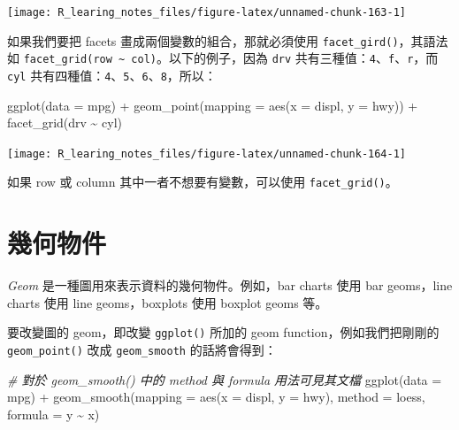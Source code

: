 \documentclass[
]{book}
\newenvironment{Shaded}{\begin{snugshade}}{\end{snugshade}}
\newcommand{\AttributeTok}[1]{\textcolor[rgb]{0.77,0.63,0.00}{#1}}
\newcommand{\CommentTok}[1]{\textcolor[rgb]{0.56,0.35,0.01}{\textit{#1}}}
\newcommand{\FunctionTok}[1]{\textcolor[rgb]{0.00,0.00,0.00}{#1}}
\newcommand{\NormalTok}[1]{#1}
\newcommand{\SpecialCharTok}[1]{\textcolor[rgb]{0.00,0.00,0.00}{#1}}
\newcommand{\StringTok}[1]{\textcolor[rgb]{0.31,0.60,0.02}{#1}}
\theoremstyle{definition}
\theoremstyle{remark}
\begin{document}
\begin{center}\texttt{[image: R\_learing\_notes\_files/figure-latex/unnamed-chunk-163-1]} \end{center}

如果我們要把 facets 畫成兩個變數的組合，那就必須使用 \texttt{facet\_gird()}，其語法如 \texttt{facet\_grid(row\ \textasciitilde{}\ col)}。以下的例子，因為 \texttt{drv} 共有三種值：\texttt{4}、\texttt{f}、\texttt{r}，而 \texttt{cyl} 共有四種值：\texttt{4}、\texttt{5}、\texttt{6}、\texttt{8}，所以：

\begin{Shaded}
\begin{Highlighting}[]
\FunctionTok{ggplot}\NormalTok{(}\AttributeTok{data =}\NormalTok{ mpg) }\SpecialCharTok{+}
      \FunctionTok{geom\_point}\NormalTok{(}\AttributeTok{mapping =} \FunctionTok{aes}\NormalTok{(}\AttributeTok{x =}\NormalTok{ displ, }\AttributeTok{y =}\NormalTok{ hwy)) }\SpecialCharTok{+}
      \FunctionTok{facet\_grid}\NormalTok{(drv }\SpecialCharTok{\textasciitilde{}}\NormalTok{ cyl)}
\end{Highlighting}
\end{Shaded}

\begin{center}\texttt{[image: R\_learing\_notes\_files/figure-latex/unnamed-chunk-164-1]} \end{center}

如果 row 或 column 其中一者不想要有變數，可以使用 \texttt{facet\_grid()}。

\hypertarget{ux5e7eux4f55ux7269ux4ef6}{%
\section{幾何物件}\label{ux5e7eux4f55ux7269ux4ef6}}

\emph{Geom} 是一種圖用來表示資料的幾何物件。例如，bar charts 使用 bar geoms，line charts 使用 line geoms，boxplots 使用 boxplot geoms 等。

要改變圖的 geom，即改變 \texttt{ggplot()} 所加的 geom function，例如我們把剛剛的 \texttt{geom\_point()} 改成 \texttt{geom\_smooth} 的話將會得到：

\begin{Shaded}
\begin{Highlighting}[]
\CommentTok{\# 對於 geom\_smooth() 中的 method 與 formula 用法可見其文檔}
\FunctionTok{ggplot}\NormalTok{(}\AttributeTok{data =}\NormalTok{ mpg) }\SpecialCharTok{+}
      \FunctionTok{geom\_smooth}\NormalTok{(}\AttributeTok{mapping =} \FunctionTok{aes}\NormalTok{(}\AttributeTok{x =}\NormalTok{ displ, }\AttributeTok{y =}\NormalTok{ hwy), }\AttributeTok{method =} \StringTok{\textquotesingle{}loess\textquotesingle{}}\NormalTok{, }\AttributeTok{formula =} \StringTok{\textquotesingle{}y \textasciitilde{} x\textquotesingle{}}\NormalTok{)}
\end{Highlighting}
\end{Shaded}
\end{document}
